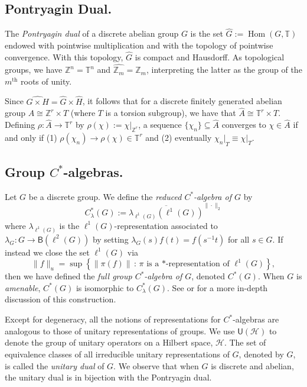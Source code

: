 \documentclass[11pt, twoside]{amsart}
\newcommand{\te}[1]{\operatorname{#1}}
\newcommand{\tn}{\mathbb{T}}
\newcommand{\zn}{\mathbb{Z}}
\newcommand{\sse}{\subseteq}
\newcommand{\mc}{\mathcal}
\newcommand{\ov}{\overline}
\newcommand{\wh}{\widehat}
\renewcommand{\l}{\left}
\renewcommand{\r}{\right}
\newcommand{\usf}{\textsf{U}}
\newcommand{\bsf}{\textsf{B}}
\theoremstyle{definition}
\newcommand{\on}{\operatorname}
\newcommand{\B}{\mathbb}
\newcommand{\Z}{\B{Z}}
\newcommand{\T}{\B{T}}
\newcommand{\str}{\texorpdfstring}
\newcommand{\TT}{\mathbb{T}}
\begin{document}
\subsection{Pontryagin Dual.}
The {\em Pontryagin dual} of a discrete abelian group $G$ is the set $\widehat{G}:=\on{Hom}(G,\TT)$ endowed with pointwise multiplication and with the topology of pointwise convergence. With this topology, $\widehat{G}$ is compact and Hausdorff. As topological groups, we have $\widehat{\Z^n}=\TT^n$ and $\widehat{\Z_m}=\Z_m$, interpreting the latter as the group of the $m^{\te{th}}$ roots of unity.
\par
Since $\widehat{G\times H}=\widehat{G}\times \widehat{H}$, it follows that for a discrete finitely generated abelian group $A\cong\Z^r\times T$ (where $T$ is a torsion subgroup), we have that $\wh{A}\cong\T^r\times T$. Defining $\rho:\wh{A}\rightarrow \tn^r$ by $\rho(\chi):=\chi|_{\zn^r}$, a sequence $\{\chi_n\}\sse \wh{A}$ converges to $\chi\in \wh{A}$ if and only if (1) $\rho(\chi_n)\rightarrow\rho(\chi)\in\tn^r$ and (2) eventually ${\chi_n|}_{T}\equiv{\chi|}_T$.\par 
 

\subsection{Group \str{$C^*$}{C*}-algebras.}Let $G$ be a discrete group. We define the {\em reduced $C^*$-algebra of $G$} by
\[C_{\lambda}^*(G):=\ov{\lambda_{\ell^1(G)}(\ell^1(G))}^{\|\cdot\|_2}\]
where $\lambda_{\ell^1(G)}$ is the $\ell^1(G)$-representation associated to $\lambda_G:G\rightarrow \bsf(\ell^2(G))$ by setting $\lambda_G(s)f(t)=f(s^{-1}t)$ for all $s\in G$. If instead we close the set $\ell^1(G)$ via 
\[\|f\|_u=\sup\l\{\|\pi(f)\|\,\colon\,\pi\text{ is a *-representation of }\ell^1(G)\r\},\]
then we have defined the {\em full group $C^*$-algebra of $G$}, denoted $C^*(G)$.
When $G$ is {\em amenable}, $C^*(G)$ is isomorphic to $C^*_{\lambda}(G)$. See \cite[Ch. VII]{Dav96} or \cite[13.9 (p.303)]{Dix77} for a more in-depth discussion of this construction.

Except for degeneracy, all the notions of representations for $C^*$-algebras are analogous to those of unitary representations of groups. We use $\usf(\mc{H})$ to denote the group of unitary operators on a Hilbert space, $\mc{H}$. The set of equivalence classes of all irreducible unitary representations of $G$, denoted by $\wh{G}$, is called the {\em unitary dual} of $G$. We observe that when $G$ is discrete and abelian, the unitary dual is in bijection with the Pontryagin dual.
\end{document}
